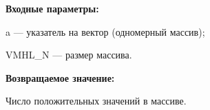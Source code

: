 \textbf{Входные параметры:}

 a --- указатель на вектор (одномерный массив);
 
 VMHL\_N --- размер массива.

\textbf{Возвращаемое значение:}

Число положительных значений в массиве.